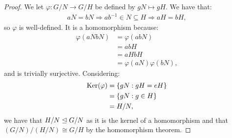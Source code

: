 \begin{proof}
    We let $\varphi : G/N \to G/H$ be defined by $gN \mapsto gH$.
    We have that: \begin{align*}
        aN = bN \Rightarrow ab^{-1} \in N \subseteq H \Rightarrow aH = bH,
    \end{align*} so $\varphi$ is well-defined. It is a homomorphism
    because: \begin{align*}
        \varphi(aNbN) &= \varphi(abN) \\
        &= abH \\
        &= aHbH \\
        &= \varphi(aN)\varphi(bN),
    \end{align*} and is trivially surjective. Considering: \begin{align*}
        \operatorname{Ker}(\varphi) 
        &= \{gN : gH = eH\} \\
        &= \{gN : g \in H\} \\
        &= H/N,
    \end{align*} we have that $H / N \trianglelefteq G / N$ as it is the kernel
    of a homomorphism and that \linebreak 
    $(G / N)/(H / N) \cong G / H$ by the
    homomorphism theorem.
\end{proof}
